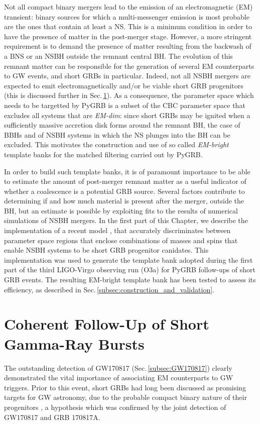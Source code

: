 \documentclass[binding=0.6cm, LaM]{sapthesis}
\begin{document}
	Not all compact binary mergers lead to the emission of an electromagnetic (EM) transient:
        binary sources for which a multi-messenger emission is most probable are the ones that contain at least a NS.
        This is a minimum condition in order to have the presence of matter in the post-merger stage.
        However, a more stringent requirement is to demand
        the presence of matter resulting from the backwash of a BNS or an NSBH
        outside the remnant central BH.
        The evolution of this remnant matter can be responsible for the generation of several EM counterparts to GW events, and short GRBs in particular.
        Indeed, not all NSBH mergers are expected to emit electromagnetically and/or be viable short GRB progenitors (this is discussed further in Sec.\,\ref{sec:grbfollowup}).
        As a consequence, the parameter space which needs to be targetted by {\ttfamily PyGRB}
        is a subset of the CBC parameter space that excludes all systems that are \textit{EM-dim}:
        since short GRBs may be ignited when a sufficiently massive accretion disk forms around the remnant BH,
        the case of BBHs and of NSBH systems in which the NS plunges into the BH can be excluded.
        This motivates the construction and use of
        so called \textit{EM-bright} template banks for the matched filtering carried out by {\ttfamily PyGRB}.

        In order to build such template banks,
        it is of paramount importance to be able to estimate the amount of post-merger remnant matter as a useful indicator of
        whether a coalescence is a potential GRB source.
        Several factors contribute to determining if and how much material is present after the merger, outside the BH,
        but an estimate is possible by exploiting fits to the results of
        numerical simulations of NSBH mergers.
        In the first part of this Chapter, we describe the implementation of a recent model \cite{54}, that accurately discriminates between parameter space
        regions that enclose combinations of masses and spins that enable NSBH systems to be short GRB progenitor canidates.
        This implementation was used to generate the template bank adopted during the first part of the third LIGO-Virgo observing run (O3a) for {\ttfamily PyGRB} follow-ups of short GRB events.
        The resulting EM-bright template bank has been tested to assess its efficiency, as described in Sec.\,\ref{subsec:construction_and_validation}.

\section{Coherent Follow-Up of Short Gamma-Ray Bursts}
\label{sec:grbfollowup}
	The outstanding detection of GW170817 (Sec.\,\ref{subsec:GW170817}) 
        clearly demonstrated the vital importance of associating EM counterparts to GW triggers.
        Prior to this event, short GRBs had long been discussed as promising targets for GW astronomy,
        due to the probable compact binary nature of their progenitors \cite{154},
        a hypothesis which was confirmed by the joint detection of GW170817 and GRB 170817A.	
\end{document}
